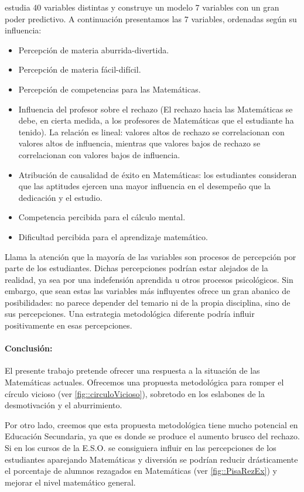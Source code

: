 \cite{ActitudesHaciaMates} estudia 40 variables distintas y construye un modelo 7 variables con un gran poder predictivo.
%
A continuación presentamos las 7 variables, ordenadas según su influencia: 
%
\begin{itemize}
\vspace{-0.4cm}\item Percepción de materia aburrida-divertida.
\vspace{-0.4cm}\item Percepción de materia fácil-difícil.
\vspace{-0.4cm}\item Percepción de competencias para las Matemáticas.
\vspace{-0.4cm}\item Influencia del profesor sobre el rechazo (El rechazo hacia las Matemáticas se debe, en cierta medida, a los profesores de Matemáticas que el estudiante ha tenido). La relación es lineal: valores altos de rechazo se correlacionan con valores altos de influencia, mientras que valores bajos de rechazo se correlacionan con valores bajos de influencia.
\vspace{-0.4cm}\item Atribución de causalidad de éxito en Matemáticas: los estudiantes consideran que las aptitudes ejercen una mayor influencia en el desempeño que la dedicación y el estudio.
\vspace{-0.4cm}\item Competencia percibida para el cálculo mental.
\vspace{-0.4cm}\item Dificultad percibida para el aprendizaje matemático.
\end{itemize}

Llama la atención que la mayoría de las variables son procesos de percepción por parte de los estudiantes.
%
Dichas percepciones podrían estar alejados de la realidad, ya sea por una indefensión aprendida u otros procesos psicológicos.
%
Sin embargo, que sean estas las variables más influyentes ofrece un gran abanico de posibilidades: no parece depender del temario ni de la propia disciplina, sino de sus percepciones.
%
Una estrategia metodológica diferente podría influir  positivamente en esas percepciones.

\paragraph{Conclusión:} El presente trabajo pretende ofrecer una respuesta a la situación de las Matemáticas actuales.
%
Ofrecemos una propuesta metodológica para romper el círculo vicioso (ver \ref{fig::circuloVicioso}), sobretodo en los eslabones de la desmotivación y el aburrimiento.

Por otro lado, creemos que esta propuesta metodológica tiene mucho potencial en Educación Secundaria, ya que es donde se produce el aumento brusco del rechazo.
%
Si en los cursos de la E.S.O. se consiguiera influir en las percepciones de los estudiantes aparejando Matemáticas y diversión se podrían reducir drásticamente el porcentaje de alumnos rezagados en Matemáticas (ver \ref{fig::PisaRezEx}) y mejorar el nivel matemático general.

